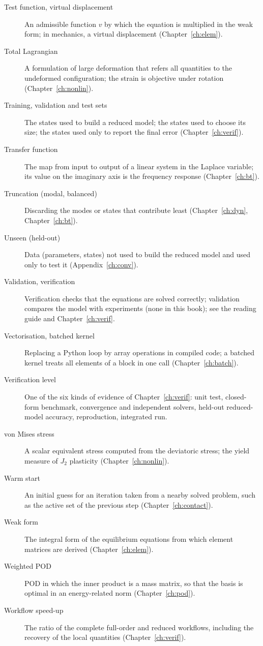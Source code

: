 \begin{description}
\item[Test function, virtual displacement] An admissible function $v$ by which the equation is multiplied in the weak form; in mechanics, a virtual displacement (Chapter~\ref{ch:elem}).
\item[Total Lagrangian] A formulation of large deformation that refers all quantities to the undeformed configuration; the strain is objective under rotation (Chapter~\ref{ch:nonlin}).
\item[Training, validation and test sets] The states used to build a reduced model; the states used to choose its size; the states used only to report the final error (Chapter~\ref{ch:verif}).
\item[Transfer function] The map from input to output of a linear system in the Laplace variable; its value on the imaginary axis is the frequency response (Chapter~\ref{ch:bt}).
\item[Truncation (modal, balanced)] Discarding the modes or states that contribute least (Chapter~\ref{ch:dyn}, Chapter~\ref{ch:bt}).
\item[Unseen (held-out)] Data (parameters, states) not used to build the reduced model and used only to test it (Appendix~\ref{ch:conv}).
\item[Validation, verification] Verification checks that the equations are solved correctly; validation compares the model with experiments (none in this book); see the reading guide and Chapter~\ref{ch:verif}.
\item[Vectorisation, batched kernel] Replacing a Python loop by array operations in compiled code; a batched kernel treats all elements of a block in one call (Chapter~\ref{ch:batch}).
\item[Verification level] One of the six kinds of evidence of Chapter~\ref{ch:verif}: unit test, closed-form benchmark, convergence and independent solvers, held-out reduced-model accuracy, reproduction, integrated run.
\item[von Mises stress] A scalar equivalent stress computed from the deviatoric stress; the yield measure of $J_2$ plasticity (Chapter~\ref{ch:nonlin}).
\item[Warm start] An initial guess for an iteration taken from a nearby solved problem, such as the active set of the previous step (Chapter~\ref{ch:contact}).
\item[Weak form] The integral form of the equilibrium equations from which element matrices are derived (Chapter~\ref{ch:elem}).
\item[Weighted POD] POD in which the inner product is a mass matrix, so that the basis is optimal in an energy-related norm (Chapter~\ref{ch:pod}).
\item[Workflow speed-up] The ratio of the complete full-order and reduced workflows, including the recovery of the local quantities (Chapter~\ref{ch:verif}).
\end{description}
